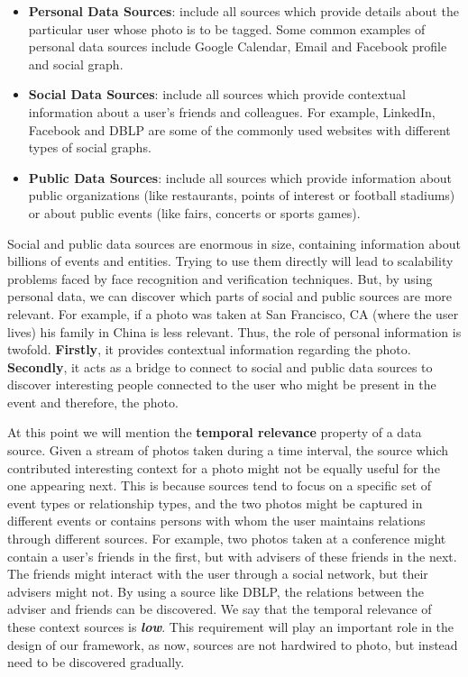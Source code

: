 \begin{itemize}
\item \textbf{Personal Data Sources}: include all sources which provide details about the particular user whose photo is to be tagged. Some common examples of personal data sources include Google Calendar, Email and Facebook profile and social graph.
\item \textbf{Social Data Sources}: include all sources which provide contextual information about a user's friends and colleagues. For example, LinkedIn, Facebook and DBLP are some of the commonly used websites with different types of social graphs.
\item \textbf{Public Data Sources}: include all sources which provide information about public organizations (like restaurants, points of interest or football stadiums) or about public events (like fairs, concerts or sports games).
\end{itemize}

Social and public data sources are enormous in size, containing information about billions of events and entities. Trying to use them directly will lead to scalability problems faced by face recognition and verification techniques. But, by using personal data, we can discover which parts of social and public sources are more relevant. For example, if a photo was taken at San Francisco, CA (where the user lives) his family in China is less relevant. Thus, the role of personal information is twofold. \textbf{Firstly}, it provides contextual information regarding the photo. \textbf{Secondly}, it acts as a bridge to connect to social and public data sources to discover interesting people connected to the user who might be present in the event and therefore, the photo.

At this point we will mention the \textbf{temporal relevance} property of a data source. Given a stream of photos taken during a time interval, the source which contributed interesting context for a photo might not be equally useful for the one appearing next. This is because sources tend to focus on a specific set of event types or relationship types, and the two photos might be captured in different events or contains persons with whom the user maintains relations through different sources. For example, two photos taken at a conference might contain a user's friends in the first, but with advisers of these friends in the next. The friends might interact with the user through a social network, but their advisers might not. By using a source like DBLP, the relations between the adviser and friends can be discovered. We say that the temporal relevance of these context sources is \textbf{\textit{low}}. This requirement will play an important role in the design of our framework, as now, sources are not hardwired to photo, but instead need to be discovered gradually.


